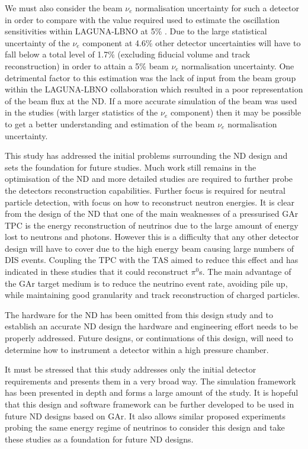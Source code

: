 We must also consider the beam $\nu_{e}$ normalisation uncertainty for such a detector in order to compare with the value required used to estimate the oscillation sensitivities within LAGUNA-LBNO at 5\% \cite{lbnoSignNormUncertainty}. Due to the large statistical uncertainty of the $\nu_{e}$ component at 4.6\% other detector uncertainties will have to fall below a total level of 1.7\% (excluding fiducial volume and track reconstruction) in order to attain a 5\% beam $\nu_{e}$ normalisation uncertainty. One detrimental factor to this estimation was the lack of input from the beam group within the LAGUNA-LBNO collaboration which resulted in a poor representation of the beam flux at the ND. If a more accurate simulation of the beam was used in the studies (with larger statistics of the $\nu_{e}$ component) then it may be possible to get a better understanding and estimation of the beam $\nu_{e}$ normalisation uncertainty.

This study has addressed the initial problems surrounding the ND design and sets the foundation for future studies. Much work still remains in the optimisation of the ND and more detailed studies are required to further probe the detectors reconstruction capabilities. Further focus is required for neutral particle detection, with focus on how to reconstruct neutron energies. It is clear from the design of the ND that one of the main weaknesses of a pressurised GAr TPC is the energy reconstruction of neutrinos due to the large amount of energy lost to neutrons and photons. However this is a difficulty that any other detector design will have to cover due to the high energy beam causing large numbers of DIS events. Coupling the TPC with the TAS aimed to reduce this effect and has indicated in these studies that it could reconstruct $\pi^{0}$s. The main advantage of the GAr target medium is to reduce the neutrino event rate, avoiding pile up, while maintaining good granularity and track reconstruction of charged particles. 

The hardware for the ND has been omitted from this design study and to establish an accurate ND design the hardware and engineering effort needs to be properly addressed. Future designs, or continuations of this design, will need to determine how to instrument a detector within a high pressure chamber. 

It must be stressed that this study addresses only the initial detector requirements and presents them in a very broad way. The simulation framework has been presented in depth and forms a large amount of the study. It is hopeful that this design and software framework can be further developed to be used in future ND designs based on GAr. It also allows similar proposed experiments probing the same energy regime of neutrinos to consider this design and take these studies as a foundation for future ND designs. 




